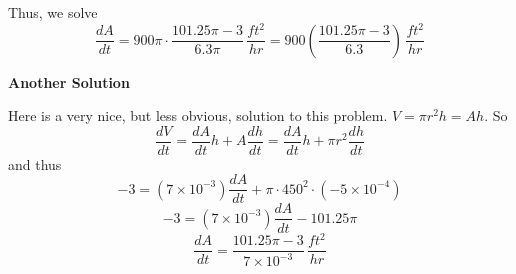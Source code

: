 \documentclass[handout,nooutcomes]{ximera}
\newcommand{\dd}[2][]{\frac{d #1}{d #2}}
\newcommand{\dfn}{\textbf}
\renewenvironment{freeResponse}{
\ifhandout\setbox0\vbox\bgroup\else
\begin{trivlist}\item[\hskip \labelsep\bfseries Solution:\hspace{2ex}]
\fi}
{\ifhandout\egroup\else
\end{trivlist}
\fi}
\begin{document}
\begin{problem}
\begin{freeResponse}
		Thus, we solve
		$$ \dd[A]{t} = 900 \pi \cdot \frac{101.25 \pi - 3}{6.3 \pi} \, \frac{ft^2}{hr} = 900 \left( \frac{101.25 \pi - 3}{6.3} \right) \, \frac{ft^2}{hr} $$
		
		\dfn{Another Solution}
		
		Here is a very nice, but less obvious, solution to this problem.
		$V = \pi r^2 h = Ah$.  So 
		$$ \dd[V]{t} = \dd[A]{t} h + A \dd[h]{t} = \dd[A]{t} h + \pi r^2 \dd[h]{t}$$
		and thus
		$$ -3 = (7 \times 10^{-3}) \dd[A]{t} + \pi \cdot 450^2 \cdot (-5 \times 10^{-4}) $$
		$$ -3 = (7 \times 10^{-3}) \dd[A]{t} - 101.25 \pi  $$
		$$ \dd[A]{t} = \frac{101.25 \pi - 3}{7 \times 10^{-3}} \, \frac{ft^2}{hr} $$

		\end{freeResponse}
		
		
\end{problem}







\newpage
\end{document}

